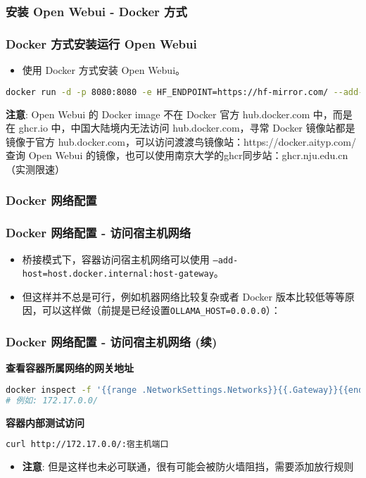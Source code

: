 \begin{frame}[fragile]
	\frametitle{安装 Open Webui - Docker 方式}
	\subsubsection{Docker 方式安装运行 Open Webui}
	\begin{itemize}
		\item 使用 Docker 方式安装 Open Webui。
	\end{itemize}
	\begin{lstlisting}[language=bash]
docker run -d -p 8080:8080 -e HF_ENDPOINT=https://hf-mirror.com/ --add-host=host.docker.internal:host-gateway -v open-webui:/app/backend/data --name open-webui --restart always swr.cn-north-4.myhuaweicloud.com/ddn-k8s/ghcr.io/open-webui/open-webui:latest
\end{lstlisting}
	\textbf{注意}:
	Open Webui 的 Docker image 不在 Docker 官方 hub.docker.com 中，而是在 ghcr.io 中，中国大陆境内无法访问 hub.docker.com，寻常 Docker 镜像站都是镜像于官方 hub.docker.com，可以访问渡渡鸟镜像站：https://docker.aityp.com/ 查询 Open Webui 的镜像，也可以使用南京大学的ghcr同步站：ghcr.nju.edu.cn （实测限速）
\end{frame}

\begin{frame}
	\frametitle{Docker 网络配置}
	\subsubsection{Docker 网络配置 - 访问宿主机网络}
	\begin{itemize}
		\item 桥接模式下，容器访问宿主机网络可以使用 \texttt{--add-host=host.docker.internal:host-gateway}。
		\item 但这样并不总是可行，例如机器网络比较复杂或者 Docker 版本比较低等等原因，可以这样做（前提是已经设置\lstinline|OLLAMA_HOST=0.0.0.0|）：
	\end{itemize}
\end{frame}

\begin{frame}[fragile]
	\frametitle{Docker 网络配置 - 访问宿主机网络 (续)}
	\textbf{查看容器所属网络的网关地址}
	\begin{lstlisting}[language=bash]
docker inspect -f '{{range .NetworkSettings.Networks}}{{.Gateway}}{{end}}' <容器名称或ID>
# 例如: 172.17.0.0/
\end{lstlisting}
	\textbf{容器内部测试访问}
	\begin{lstlisting}[language=bash]
curl http://172.17.0.0/:宿主机端口
\end{lstlisting}
	\begin{itemize}
		\item \textbf{注意}: 但是这样也未必可联通，很有可能会被防火墙阻挡，需要添加放行规则
	\end{itemize}
\end{frame}

